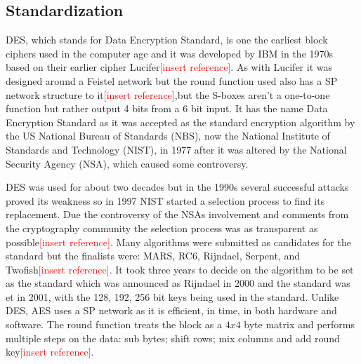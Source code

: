 \documentclass[12pt,twoside,a4paper]{report}
\begin{document}
	\subsection{Standardization}
	DES, which stands for Data Encryption Standard, is one the earliest block ciphers used in the computer age and it was developed by IBM in the 1970s based on their earlier cipher Lucifer\textcolor{red}{[insert reference]}. As with Lucifer it was designed around a Feistel network but the round function used also has a SP network structure to it\textcolor{red}{[insert reference]},but the S-boxes aren't a one-to-one function but rather output 4 bits from a 6 bit input. It has the name Data Encryption Standard as it was accepted as the standard encryption algorithm by the US National Bureau of Standards (NBS), now the National Institute of Standards and Technology (NIST), in 1977 after it was altered by the National Security Agency (NSA), which caused some controversy\cite{ComputerSecurityDivision1999}.
    
	DES was used for about two decades but in the 1990s several successful attacks proved its weakness\cite{Team} so in 1997 NIST started a selection process to find its replacement. Due the controversy of the NSAs involvement and comments from the cryptography community the selection process was as transparent as possible\textcolor{red}{[insert reference]}. Many algorithms were submitted as candidates for the standard but the finalists were: MARS, RC6, Rijndael, Serpent, and Twofish\textcolor{red}{[insert reference]}. It took three years to decide on the algorithm to be set as the standard which was announced as Rijndael in 2000 and the standard was et in 2001, with the 128, 192, 256 bit keys being used in the standard\cite{ComputerSecurityDivision2001}. Unlike DES, AES uses a SP network as it is efficient, in time, in both hardware and software. The round function treats the block as a $4x4$ byte matrix and performs multiple steps on the data: sub bytes; shift rows; mix columns and add round key\textcolor{red}{[insert reference]}.
    
\end{document}
